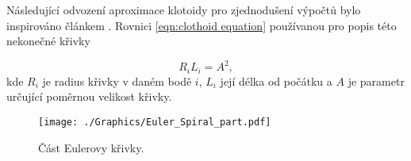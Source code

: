 \documentclass[czech, bc, kky, he, iso690numb]{fasthesis}
\begin{document}
                Následující odvození aproximace klotoidy pro zjednodušení výpočtů bylo inspirováno článkem \cite{eliou_kaliabetsos_2013}. Rovnici \ref{eqn:clothoid equation} používanou pro popis této nekonečné křivky 
                    
                    \begin{equation}
                        R_{i}L_{i} = A^{2},
                        \label{eqn:clothoid equation}
                    \end{equation}
                 kde \(R_{i}\) je radius křivky v daném bodě \(i\), \(L_{i}\) její délka od počátku a \(A\) je parametr určující poměrnou velikost křivky.
                 
                 	\begin{figure}[ht]
                 		\centering
                 		\texttt{[image: ./Graphics/Euler\_Spiral\_part.pdf]}
                 		\caption{Část Eulerovy křivky.}
                 		\label{pic:Eulerova_krivka_cast}
                 	\end{figure}
                 	
\end{document}
